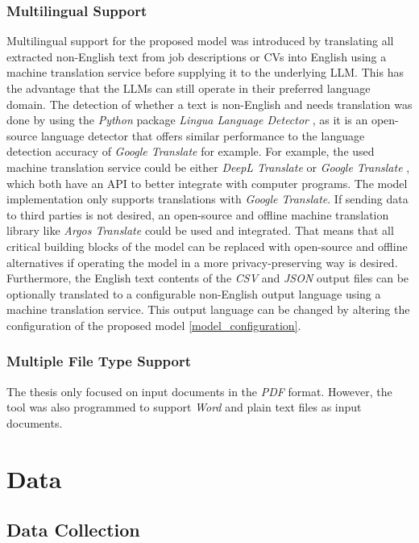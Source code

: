 \documentclass[draft,final]{thesisclass} %
\begin{document}
\subsection{Multilingual Support}
Multilingual support for the proposed model was introduced by translating all extracted non-English text from job descriptions or \acs{CV}s into English using a machine translation service before supplying it to the underlying \acs{LLM}.
This has the advantage that the \acs{LLM}s can still operate in their preferred language domain.
The detection of whether a text is non-English and needs translation was done by using the \textit{Python} package \textit{Lingua Language Detector} \parencite{lingua_language_detector}, as it is an open-source language detector that offers similar performance to the language detection accuracy of \textit{Google Translate} for example.
For example, the used machine translation service could be either \textit{DeepL Translate} \parencite{deepl_translate} or \textit{Google Translate} \parencite{google_translate}, which both have an API to better integrate with computer programs.
The model implementation only supports translations with \textit{Google Translate}.
If sending data to third parties is not desired, an open-source and offline machine translation library like \textit{Argos Translate} \parencite{argos_translate} could be used and integrated.
That means that all critical building blocks of the model can be replaced with open-source and offline alternatives if operating the model in a more privacy-preserving way is desired.
Furthermore, the English text contents of the \textit{CSV} and \textit{JSON} output files can be optionally translated to a configurable non-English output language using a machine translation service.
This output language can be changed by altering the configuration of the proposed model \ref{model_configuration}.

\subsection{Multiple File Type Support}
The thesis only focused on input documents in the \textit{PDF} format.
However, the tool was also programmed to support \textit{Word} and plain text files as input documents.

\chapter{Data}

\section{Data Collection}
\end{document}
